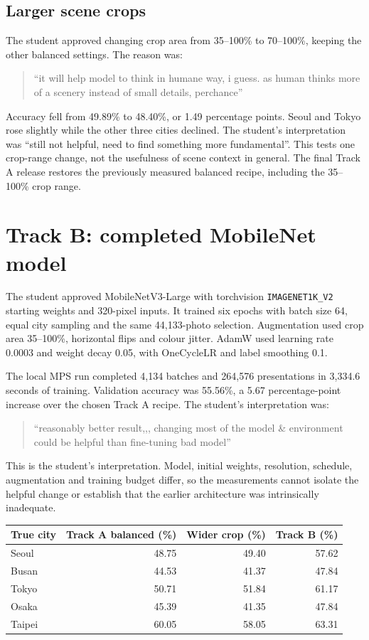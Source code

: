 \documentclass[11pt]{article}
\begin{document}
\subsection*{Larger scene crops}
The student approved changing crop area from 35--100\% to 70--100\%, keeping the other balanced settings. The reason was:
\begin{quote}
``it will help model to think in humane way, i guess. as human thinks more of a scenery instead of small details, perchance''
\end{quote}
Accuracy fell from 49.89\% to 48.40\%, or 1.49 percentage points. Seoul and Tokyo rose slightly while the other three cities declined. The student's interpretation was ``still not helpful, need to find something more fundamental''. This tests one crop-range change, not the usefulness of scene context in general. The final Track A release restores the previously measured balanced recipe, including the 35--100\% crop range.

\section*{Track B: completed MobileNet model}
The student approved MobileNetV3-Large with torchvision \texttt{IMAGENET1K\_V2} starting weights and 320-pixel inputs. It trained six epochs with batch size 64, equal city sampling and the same 44,133-photo selection. Augmentation used crop area 35--100\%, horizontal flips and colour jitter. AdamW used learning rate 0.0003 and weight decay 0.05, with OneCycleLR and label smoothing 0.1.

The local MPS run completed 4,134 batches and 264,576 presentations in 3,334.6 seconds of training. Validation accuracy was 55.56\%, a 5.67 percentage-point increase over the chosen Track A recipe. The student's interpretation was:
\begin{quote}
``reasonably better result,,, changing most of the model \& environment could be helpful than fine-tuning bad model''
\end{quote}
This is the student's interpretation. Model, initial weights, resolution, schedule, augmentation and training budget differ, so the measurements cannot isolate the helpful change or establish that the earlier architecture was intrinsically inadequate.

\begin{center}\small
\begin{tabular}{lrrr}
\toprule True city & Track A balanced (\%) & Wider crop (\%) & Track B (\%) \\ \midrule
Seoul & 48.75 & 49.40 & 57.62 \\
Busan & 44.53 & 41.37 & 47.84 \\
Tokyo & 50.71 & 51.84 & 61.17 \\
Osaka & 45.39 & 41.35 & 47.84 \\
Taipei & 60.05 & 58.05 & 63.31 \\
\bottomrule
\end{tabular}
\end{center}
\end{document}
